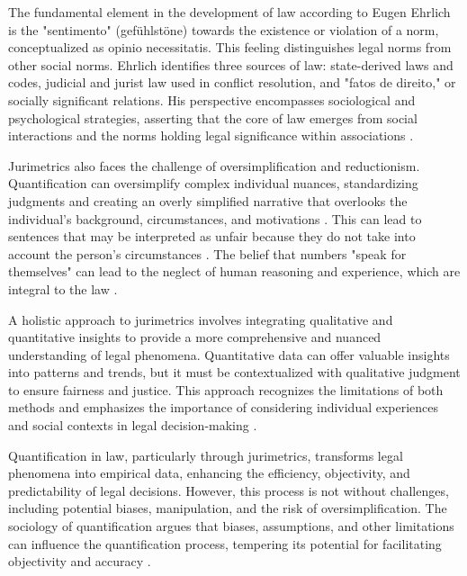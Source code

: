The fundamental element in the development of law according to Eugen Ehrlich is the "sentimento" (gefühlstöne) towards the existence or violation of a norm, conceptualized as opinio necessitatis. This feeling distinguishes legal norms from other social norms. Ehrlich identifies three sources of law: state-derived laws and codes, judicial and jurist law used in conflict resolution, and "fatos de direito," or socially significant relations. His perspective encompasses sociological and psychological strategies, asserting that the core of law emerges from social interactions and the norms holding legal significance within associations \cite{konzen2024}.

Jurimetrics also faces the challenge of oversimplification and reductionism. Quantification can oversimplify complex individual nuances, standardizing judgments and creating an overly simplified narrative that overlooks the individual's background, circumstances, and motivations \cite{10.1007/s11186-021-09453-1,10.1057/s41599-020-00557-0}. This can lead to sentences that may be interpreted as unfair because they do not take into account the person's circumstances \cite{10.1590/dados.2022.65.3.267,10.32586/rcda.v18i1.585}. The belief that numbers "speak for themselves" can lead to the neglect of human reasoning and experience, which are integral to the law \cite{10.1590/dados.2022.65.3.267,10.32586/rcda.v18i1.585}.

A holistic approach to jurimetrics involves integrating qualitative and quantitative insights to provide a more comprehensive and nuanced understanding of legal phenomena. Quantitative data can offer valuable insights into patterns and trends, but it must be contextualized with qualitative judgment to ensure fairness and justice. This approach recognizes the limitations of both methods and emphasizes the importance of considering individual experiences and social contexts in legal decision-making \cite{10.1007/s11186-021-09453-1,10.1057/s41599-020-00557-0}.

Quantification in law, particularly through jurimetrics, transforms legal phenomena into empirical data, enhancing the efficiency, objectivity, and predictability of legal decisions. However, this process is not without challenges, including potential biases, manipulation, and the risk of oversimplification. The sociology of quantification argues that biases, assumptions, and other limitations can influence the quantification process, tempering its potential for facilitating objectivity and accuracy \cite{salais2016}.


